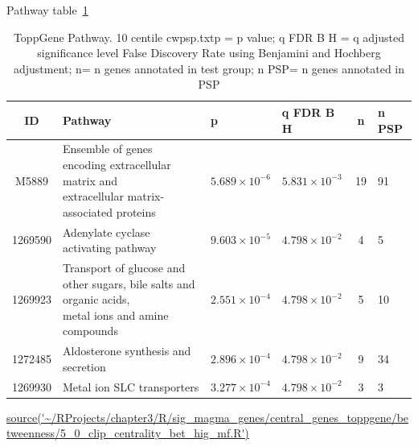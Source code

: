 Pathway table~\ref{tab:ToppGENE Pathway. 10 centile cwpsp.txtp = p value; q FDR B H = q adjusted significance level False Discovery Rate using Benjamini and Hochberg adjustment; n= n genes annotated in test group; n PSP= n genes annotated in PSP} 

\begin{table}[ht]
\centering
\begin{adjustbox}{width=\textwidth}
\setlength{\extrarowheight}{2pt}
\begin{tabular}{@{}clllcl@{}}

  \toprule
ID & Pathway & p & q FDR B H & n & n PSP \\ 
  \midrule
M5889 & \makecell{Ensemble of genes encoding extracellular matrix and\\ extracellular matrix-associated proteins}  & $5.689 \times 10^{-6}$ & $5.831 \times 10^{-3}$ & 19 & 91 \\ 
  1269590 & Adenylate cyclase activating pathway & $9.603 \times 10^{-5}$ & $4.798 \times 10^{-2}$ & 4 & 5 \\ 
  1269923 &\makecell{ Transport of glucose and other sugars, bile salts and organic acids,\\ metal ions and amine compounds} & $2.551 \times 10^{-4}$ & $4.798 \times 10^{-2}$ & 5 & 10 \\ 
  1272485 & Aldosterone synthesis and secretion & $2.896 \times 10^{-4}$ & $4.798 \times 10^{-2}$ & 9 & 34 \\ 
  1269930 & Metal ion SLC transporters & $3.277 \times 10^{-4}$ & $4.798 \times 10^{-2}$ & 3 & 3 \\ 
   \bottomrule
\end{tabular}
\end{adjustbox}
\caption{ToppGene Pathway. 10 centile cwpsp.txtp = p value; q FDR B H = q adjusted significance level False Discovery Rate using Benjamini and Hochberg adjustment; n= n genes annotated in test group; n PSP= n genes annotated in PSP} 
\tiny\url{source('~/RProjects/chapter3/R/sig_magma_genes/central_genes_toppgene/betweenness/5_0_clip_centrality_bet_hig_mf.R')}

\label{tab:ToppGENE Pathway. 10 centile cwpsp.txtp = p value; q FDR B H = q adjusted significance level False Discovery Rate using Benjamini and Hochberg adjustment; n= n genes annotated in test group; n PSP= n genes annotated in PSP}
\end{table}



